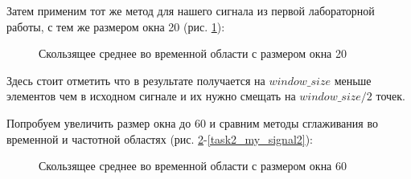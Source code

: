 \documentclass[a4paper,oneside,14pt]{extreport}
\begin{document}
\newpage
Затем применим тот же метод для нашего сигнала из первой лабораторной работы, с тем же размером окна 20 (рис. \ref{task3_my_signal}):

\begin{figure}[h]
	\caption{Скользящее среднее во временной области с размером окна 20}
	\label{task3_my_signal}
\end{figure}

Здесь стоит отметить что в результате получается на $window\_size$ меньше элементов чем в исходном сигнале и их нужно смещать на $window\_size/2$ точек.

\newpage
Попробуем увеличить размер окна до 60 и сравним методы сглаживания во временной и частотной областях (рис. \ref{task3_my_signal2}-\ref{task2_my_signal2}):

\begin{figure}[h]
	\caption{Скользящее среднее во временной области с размером окна 60}
	\label{task3_my_signal2}
\end{figure}
\end{document}
